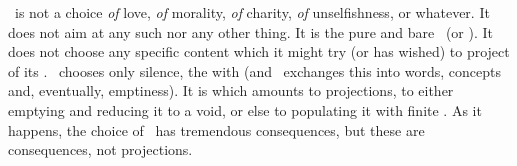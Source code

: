 \Sch\ is not a choice {\em of} love, {\em of} morality, {\em of} charity, {\em
  of} unselfishness, or whatever.  It does not aim at any such nor any other
  thing.  It is the pure and 
bare \yes\ (or \No).  It does not choose any specific content which it might try
  (or has wished) 
to project  of its .  \yes\ chooses only silence,
the  with  (and \No\ exchanges this 
 into words, concepts and, eventually, emptiness). 
It is  which amounts to projections, to either emptying
 and reducing it to a void, or else to populating it with finite
.  As it happens, the choice of \yes\ has tremendous consequences, but
these are consequences, not projections.


